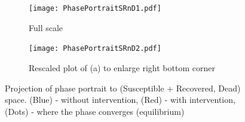 \begin{figure}[h!]
 \centering 
 \begin{subfigure}[b]{0.38\textwidth}
  \texttt{[image: PhasePortraitSRnD1.pdf]} \caption{Full scale} \label{fig:PhasePortraitA} \end{subfigure}
 \hspace{.1cm}
\begin{subfigure}[b]{0.38\textwidth}
 \texttt{[image: PhasePortraitSRnD2.pdf]} \caption{Rescaled plot of (a) to enlarge right bottom corner} \label{fiig:PhasePortraitB} \end{subfigure} 
\caption{Projection of phase portrait to (Susceptible + Recovered, Dead) space. (Blue) - without intervention, (Red) - with intervention, (Dots) - where the phase converges (equilibrium)}
\label{fig:PhasePortrait} 
\end{figure}


\clearpage




